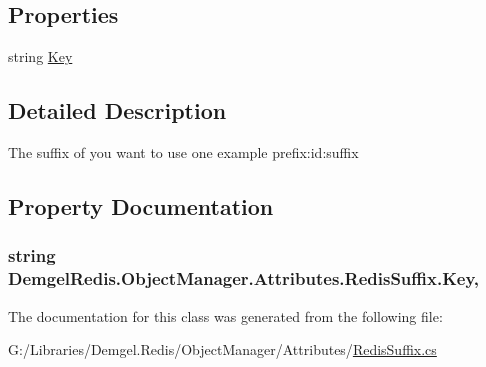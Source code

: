 \subsection*{Properties}
\begin{DoxyCompactItemize}
\item 
string \hyperlink{class_demgel_redis_1_1_object_manager_1_1_attributes_1_1_redis_suffix_ac2701651081dfc9d459adda6868e9325}{Key}
\end{DoxyCompactItemize}


\subsection{Detailed Description}
The suffix of you want to use one example prefix\+:id\+:suffix 



\subsection{Property Documentation}
\hypertarget{class_demgel_redis_1_1_object_manager_1_1_attributes_1_1_redis_suffix_ac2701651081dfc9d459adda6868e9325}{}
\subsubsection[{Key}]{\setlength{\rightskip}{0pt plus 5cm}string Demgel\+Redis.\+Object\+Manager.\+Attributes.\+Redis\+Suffix.\+Key\hspace{0.3cm}{\ttfamily [get]}, {\ttfamily [set]}}\label{class_demgel_redis_1_1_object_manager_1_1_attributes_1_1_redis_suffix_ac2701651081dfc9d459adda6868e9325}


The documentation for this class was generated from the following file\+:\begin{DoxyCompactItemize}
\item 
G\+:/\+Libraries/\+Demgel.\+Redis/\+Object\+Manager/\+Attributes/\hyperlink{_redis_suffix_8cs}{Redis\+Suffix.\+cs}\end{DoxyCompactItemize}
